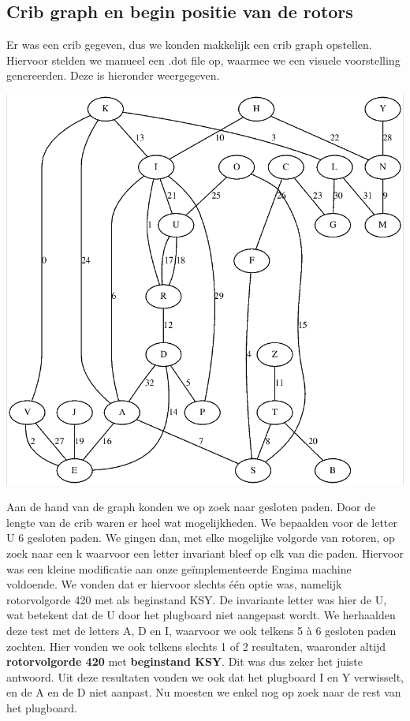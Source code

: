 \subsection{Crib graph en begin positie van de rotors}
Er was een crib gegeven, dus we konden makkelijk een crib graph opstellen. Hiervoor stelden we manueel een .dot file op, waarmee we een visuele voorstelling genereerden. Deze is hieronder weergegeven. \\
\begin{center}
\includegraphics[scale=0.25]{enigma/graph.png}
\end{center}
Aan de hand van de graph konden we op zoek naar gesloten paden. Door de lengte van de crib waren er heel wat mogelijkheden. We bepaalden voor de letter U 6 gesloten paden. We gingen dan, met elke mogelijke volgorde van rotoren, op zoek naar een k waarvoor een letter invariant bleef op elk van die paden. Hiervoor was een kleine modificatie aan onze ge\"implementeerde Engima machine voldoende. We vonden dat er hiervoor slechts \'e\'en optie was, namelijk rotorvolgorde 420 met als beginstand KSY. De invariante letter was hier de U, wat betekent dat de U door het plugboard niet aangepast wordt. We herhaalden deze test met de letters A, D en I, waarvoor we ook telkens 5 \`a 6 gesloten paden zochten. Hier vonden we ook telkens slechts 1 of 2 resultaten, waaronder altijd \textbf{rotorvolgorde 420} met \textbf{beginstand KSY}. Dit was dus zeker het juiste antwoord. Uit deze resultaten vonden we ook dat het plugboard I en Y verwisselt, en de A en de D niet aanpast. Nu moesten we enkel nog op zoek naar de rest van het plugboard.

